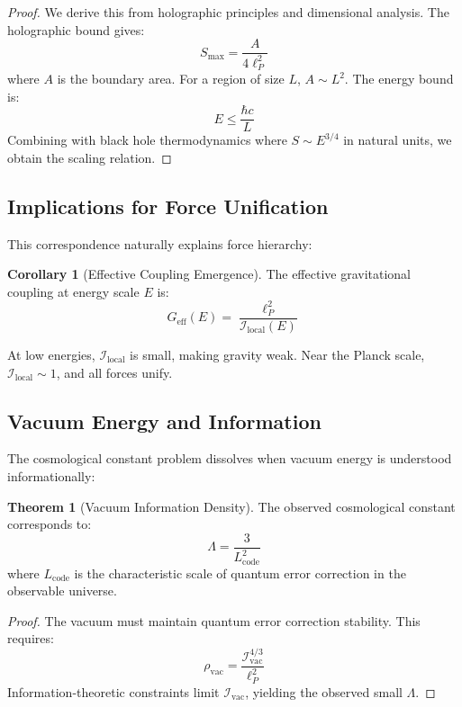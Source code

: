 \documentclass[11pt,a4paper]{article}
\theoremstyle{definition}
\newtheorem{theorem}{Theorem}[section]
\newtheorem{corollary}{Corollary}[section]
\begin{document}
\begin{proof}
We derive this from holographic principles and dimensional analysis. The holographic bound gives:
\[S_{\max} = \frac{A}{4\ell_P^2}\]
where $A$ is the boundary area. For a region of size $L$, $A \sim L^2$. The energy bound is:
\[E \leq \frac{\hbar c}{L}\]
Combining with black hole thermodynamics where $S \sim E^{3/4}$ in natural units, we obtain the scaling relation.
\end{proof}

\subsection{Implications for Force Unification}

This correspondence naturally explains force hierarchy:

\begin{corollary}[Effective Coupling Emergence]
The effective gravitational coupling at energy scale $E$ is:
\begin{equation}
G_{\text{eff}}(E) = \frac{\ell_P^2}{\mathcal{I}_{\text{local}}(E)}
\end{equation}
\end{corollary}

At low energies, $\mathcal{I}_{\text{local}}$ is small, making gravity weak. Near the Planck scale, $\mathcal{I}_{\text{local}} \sim 1$, and all forces unify.

\subsection{Vacuum Energy and Information}

The cosmological constant problem dissolves when vacuum energy is understood informationally:

\begin{theorem}[Vacuum Information Density]
The observed cosmological constant corresponds to:
\begin{equation}
\Lambda = \frac{3}{L_{\text{code}}^2}
\end{equation}
where $L_{\text{code}}$ is the characteristic scale of quantum error correction in the observable universe.
\end{theorem}

\begin{proof}
The vacuum must maintain quantum error correction stability. This requires:
\[\rho_{\text{vac}} = \frac{\mathcal{I}_{\text{vac}}^{4/3}}{\ell_P^2}\]
Information-theoretic constraints limit $\mathcal{I}_{\text{vac}}$, yielding the observed small $\Lambda$.
\end{proof}
\end{document}
